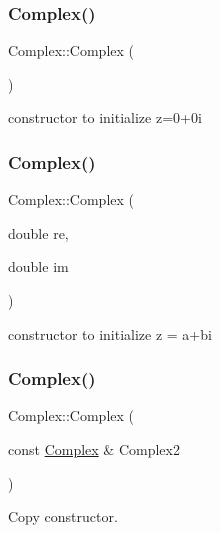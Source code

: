 \subsubsection{\texorpdfstring{Complex()}{Complex()}\hspace{0.1cm}{\footnotesize\ttfamily [1/3]}}
{\footnotesize\ttfamily Complex\+::\+Complex (\begin{DoxyParamCaption}{ }\end{DoxyParamCaption})}



constructor to initialize z=0+0i 

\mbox{\label{class_complex_a83d613f319cfea93b1a70c57801cdf80}} 
\subsubsection{\texorpdfstring{Complex()}{Complex()}\hspace{0.1cm}{\footnotesize\ttfamily [2/3]}}
{\footnotesize\ttfamily Complex\+::\+Complex (\begin{DoxyParamCaption}\item[{double}]{re,  }\item[{double}]{im }\end{DoxyParamCaption})}



constructor to initialize z = a+bi 

\mbox{\label{class_complex_a7ce22596ad4401c8e7b90084661e1757}} 
\subsubsection{\texorpdfstring{Complex()}{Complex()}\hspace{0.1cm}{\footnotesize\ttfamily [3/3]}}
{\footnotesize\ttfamily Complex\+::\+Complex (\begin{DoxyParamCaption}\item[{const \mbox{\hyperlink{class_complex}{Complex}} \&}]{Complex2 }\end{DoxyParamCaption})}



Copy constructor. 

\mbox{\label{class_complex_a70e14b17c92e3da779686b98f9f3bb2d}} 
